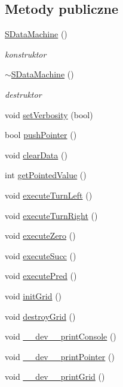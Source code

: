 \subsection*{Metody publiczne}
\begin{CompactItemize}
\item 
\hyperlink{classSDataMachine_3d894df00bd2283c717a827e27138812}{SDataMachine} ()
\begin{CompactList}\small\item\em konstruktor \item\end{CompactList}\item 
\hyperlink{classSDataMachine_59bc85b25930729cbe3046e81f49f909}{$\sim$SDataMachine} ()
\begin{CompactList}\small\item\em destruktor \item\end{CompactList}\item 
void \hyperlink{classSDataMachine_38cc38f27606be24fc609d461d25ae2f}{setVerbosity} (bool)
\item 
bool \hyperlink{classSDataMachine_10eb8f56cf6235455a26c5c673b8fe15}{pushPointer} ()
\item 
void \hyperlink{classSDataMachine_b863ea9a42568d7555cc146ded9f2d88}{clearData} ()
\item 
int \hyperlink{classSDataMachine_3a191be9cab718274d6bd75e01cc2a26}{getPointedValue} ()
\item 
void \hyperlink{classSDataMachine_5b46d50c18bec1bcfd5232bec3875fd5}{executeTurnLeft} ()
\item 
void \hyperlink{classSDataMachine_fb6f52c7f14afa51eed848f354d57924}{executeTurnRight} ()
\item 
void \hyperlink{classSDataMachine_27c3e6dfe9ac45f9d5eed7c97f96abd8}{executeZero} ()
\item 
void \hyperlink{classSDataMachine_85832e07e2fb8ae32160fe0c95a487d2}{executeSucc} ()
\item 
void \hyperlink{classSDataMachine_87cfad868b3ea0a0e60f776ad3773678}{executePred} ()
\item 
void \hyperlink{classSDataMachine_7957d23c5b2fdae9249fb6e1e0c55982}{initGrid} ()
\item 
void \hyperlink{classSDataMachine_194dc73769d08eaccc158e2786b7059f}{destroyGrid} ()
\item 
void \hyperlink{classSDataMachine_da92c5d20a64279ff191059705c3070f}{\_\-\_\-dev\_\-\_\-printConsole} ()
\item 
void \hyperlink{classSDataMachine_3d2383297382e73c4f61f7fc231c34b7}{\_\-\_\-dev\_\-\_\-printPointer} ()
\item 
void \hyperlink{classSDataMachine_ec760b755d01ea8c9ef3d37aa8f749d2}{\_\-\_\-dev\_\-\_\-printGrid} ()
\end{CompactItemize}


